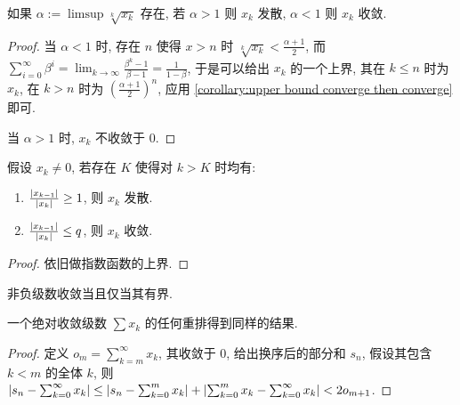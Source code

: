 \begin{lemma}[根判据]
    \label {lemma:converge root test}
    如果 \(\alpha := \limsup \sqrt[k]{x_k}\) 存在, 若 \(\alpha > 1\) 则 \(x_k\) 发散,
    \(\alpha < 1\) 则 \(x_k\) 收敛.

    \begin{proof}
        当 \(\alpha < 1\) 时, 存在 \(n\) 使得 \(x > n\) 时 \(\sqrt[k]{x_k} < \frac{\alpha + 1}{2}\),
        而 \(\sum_{i=0}^{\infty} \beta^i = \lim_{k \to \infty} \frac{\beta^k - 1}{\beta - 1} = \frac{1}{1 - \beta}\),
        于是可以给出 \(x_k\) 的一个上界, 其在 \(k \leq n\) 时为 \(x_k\), 在 \(k > n\) 时为 \({(\frac{\alpha + 1}{2})}^n\),
        应用 \ref{corollary:upper bound converge then converge} 即可.

        当 \(\alpha > 1\) 时,  \(x_k\) 不收敛于 \(0\).
    \end{proof}
\end{lemma}

\begin{lemma}[商判据]
    \label {lemma:converge quotient test}
    假设 \(x_k \neq 0\), 若存在 \(K\) 使得对 \(k > K\) 时均有:

    \begin{enumerate}
        \item \(\frac{\abs{x_{k-1}}}{\abs{x_k}} \geq 1\), 则 \(x_k\) 发散.
        \item \(\frac{\abs{x_{k-1}}}{\abs{x_k}} \leq q\), 则 \(x_k\) 收敛.
    \end{enumerate}

    \begin{proof}
        依旧做指数函数的上界.
    \end{proof}
\end{lemma}

\begin{lemma}
    非负级数收敛当且仅当其有界.
\end{lemma}

\begin{theorem}[重排定理]
    \label {theorem:rearrangement theorem}
    一个绝对收敛级数 \(\sum x_k\) 的任何重排得到同样的结果.

    \begin{proof}
        定义 \(o_m = \sum_{k=m}^{\infty} x_k\), 其收敛于 \(0\), 给出换序后的部分和 \(s_n\),
        假设其包含 \(k < m\) 的全体 \(k\), 则 \(\abs {s_n - \sum_{k=0}^{\infty} x_k} \leq \abs {s_n - \sum_{k=0}^{m} x_k} + \abs {\sum_{k=0}^{m} x_k - \sum_{k=0}^{\infty} x_k} < 2 o_{m+1}\).
    \end{proof}
\end{theorem}

